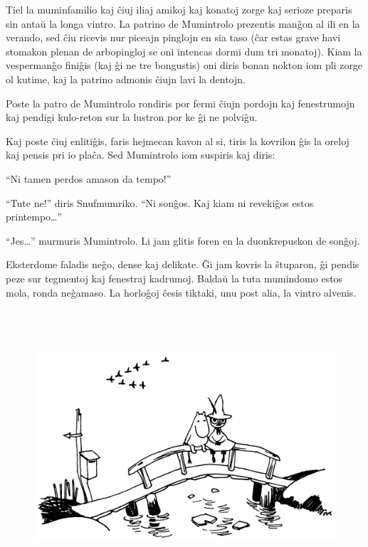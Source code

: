 Tiel la muminfamilio kaj ĉiuj iliaj amikoj kaj konatoj zorge kaj serioze preparis sin antaŭ la longa vintro. La patrino de Mumintrolo prezentis manĝon al ili en la verando, sed ĉiu ricevis nur piceajn pinglojn en sia taso (ĉar estas grave havi stomakon plenan de arbopingloj se oni intencas dormi dum tri monatoj). Kiam la vespermanĝo finiĝis (kaj ĝi ne tre bongustis) oni diris bonan nokton iom pli zorge ol kutime, kaj la patrino admonis ĉiujn lavi la dentojn.

Poste la patro de Mumintrolo rondiris por fermi ĉiujn pordojn kaj fenestrumojn kaj pendigi kulo-reton sur la lustron por ke ĝi ne polviĝu.

Kaj poste ĉiuj enlitiĝis, faris hejmecan kavon al si, tiris la kovrilon ĝis la oreloj kaj pensis pri io plaĉa. Sed Mumintrolo iom suspiris kaj diris:

``Ni tamen perdos amason da tempo!''

``Tute ne!'' diris Snufmumriko. ``Ni sonĝos. Kaj kiam ni revekiĝos estos printempo{\ldots}''

``Jes{\ldots}'' murmuris Mumintrolo. Li jam glitis foren en la duonkrepuskon de sonĝoj.

Eksterdome faladis neĝo, dense kaj delikate. Ĝi jam kovris la ŝtuparon, ĝi pendis peze sur tegmentoj kaj fenestraj kadrumoj. Baldaŭ la tuta mumindomo estos mola, ronda neĝamaso. La horloĝoj ĉesis tiktaki, unu post alia, la vintro alvenis.
\hfill \break
\hypertarget{Enkonduko}{}
\label{Enkonduko}


\chapter[Unua Ĉapitro]{}


\begin{figure}[htbp]
\centering
\includegraphics[width=399pt,height=251pt]{_2.jpg}
\caption{}
\label{_2}
\end{figure}


